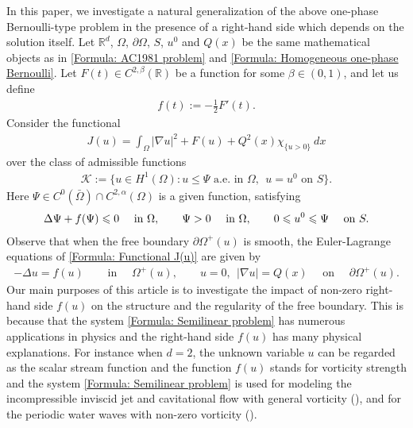 \documentclass[11pt,reqno]{amsart}
\begin{document}
In this paper, we investigate a natural generalization of the above one-phase Bernoulli-type problem in the presence of a right-hand side which depends on the solution itself. Let $\mathbb{R}^{d}$, $\Omega$, $\partial\Omega$, $S$, $u^{0}$ and $Q(x)$ be the same mathematical objects as in \eqref{Formula: AC1981 problem} and \eqref{Formula: Homogeneous one-phase Bernoulli}. Let $F(t)\in C^{2,\beta}(\mathbb{R})$ be a function for some $\beta\in(0,1)$, and let us define
\begin{align}\label{Formula: f(t)}
	f(t):=-\tfrac{1}{2}F'(t).
\end{align} 
Consider the functional
\begin{align}\label{Formula: Functional J(u)}
	J(u)=\int_{\Omega}|\nabla u|^{2}+F(u)+Q^{2}(x)\chi_{\{u>0\}}\:dx
\end{align}
over the class of admissible functions
\begin{align}\label{Formula: Admissible functions K}
	\mathcal{K}:=\{u\in H^{1}(\Omega)\colon u\leqslant\Psi\text{ a.e. in }\Omega,\ \ u=u^{0}\text{ on }S\}.
\end{align}
Here $\Psi\in C^{0}(\bar{\Omega})\cap C^{2,\alpha}(\Omega)$ is a given function, satisfying
\begin{align}\label{Formula: Psi}
	\Delta\Psi+f(\Psi)\leqslant0\quad\text{ in }\Omega,\qquad\Psi>0\quad\text{ in }\Omega,\qquad 0\leqslant u^{0}\leqslant\Psi\quad\text{ on }S.
\end{align}
Observe that when the free boundary $\partial\varOmega^{+}(u)$ is smooth, the Euler-Lagrange equations of \eqref{Formula: Functional J(u)} are given by
\begin{align}\label{Formula: Semilinear problem}
	-\Delta u=f(u)\quad&\text{ in }\quad\varOmega^{+}(u),\qquad u=0,\ \ |\nabla u|=Q(x)\quad\text{ on }\quad\partial\varOmega^{+}(u).
\end{align}
Our main purposes of this article is to investigate the impact of non-zero right-hand side $f(u)$ on the structure and the regularity of the free boundary. This is because that the system \eqref{Formula: Semilinear problem} has numerous applications in physics and the right-hand side $f(u)$ has many physical explanations. For instance when $d=2$, the unknown variable $u$ can be regarded as the scalar stream function and the function $f(u)$ stands for vorticity strength and the system \eqref{Formula: Semilinear problem} is used for modeling the incompressible inviscid jet and cavitational flow with general vorticity (\cite{CDW2017,CDZ2017}), and for the periodic water waves with non-zero vorticity (\cite{CS2004,V2008,VW2012,WZ2012}).
\end{document}
